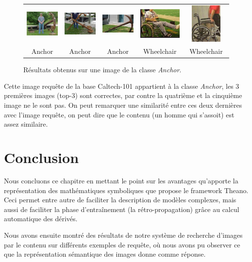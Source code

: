 \begin{figure}[H]
\begin{tabular}{ccccc}
\includegraphics[width=3cm]{Figures/anchor/1.jpg}
&
\includegraphics[width=3cm]{Figures/anchor/2.jpg}
&
\includegraphics[width=3cm]{Figures/anchor/3.jpg}
&
\includegraphics[width=3cm]{Figures/anchor/4.jpg}
&
\includegraphics[height=2cm,width=3cm]{Figures/anchor/5.jpg}\\
Anchor & Anchor & Anchor & Wheelchair & Wheelchair\\

\end{tabular}
\caption[comp7]{Résultats obtenus sur une image de la classe \textit{Anchor}.}
\end{figure}

	Cette image requête de la base Caltech-101 appartient à la classe \textit{Anchor}, les 3 premières images (top-3) sont correctes, par contre la quatrième et la cinquième image ne le sont pas. On peut remarquer une similarité entre ces deux dernières avec l'image requête, on peut dire que le contenu (un homme qui s'assoit) est assez similaire.

\section{Conclusion}

	Nous concluons ce chapitre en mettant le point sur les avantages qu'apporte la représentation des mathématiques symboliques que propose le framework Theano. Ceci permet entre autre de faciliter la description de modèles complexes, mais aussi de faciliter la phase d'entraînement (la rétro-propagation) grâce au calcul automatique des dérivés.
	
	Nous avons ensuite montré des résultats de notre système de recherche d'images par le contenu sur différents exemples de requête, où nous avons pu observer ce que la représentation sémantique des images donne comme réponse.
